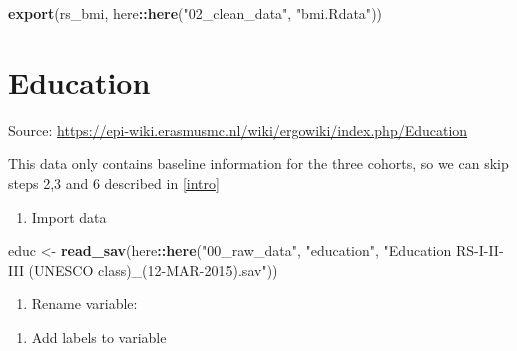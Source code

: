 \documentclass[]{book}
\newenvironment{Shaded}{\begin{snugshade}}{\end{snugshade}}
\newcommand{\DataTypeTok}[1]{\textcolor[rgb]{0.13,0.29,0.53}{#1}}
\newcommand{\KeywordTok}[1]{\textcolor[rgb]{0.13,0.29,0.53}{\textbf{#1}}}
\newcommand{\NormalTok}[1]{#1}
\newcommand{\OperatorTok}[1]{\textcolor[rgb]{0.81,0.36,0.00}{\textbf{#1}}}
\newcommand{\StringTok}[1]{\textcolor[rgb]{0.31,0.60,0.02}{#1}}
\providecommand{\tightlist}{%
  \setlength{\itemsep}{0pt}\setlength{\parskip}{0pt}}
\begin{document}
\begin{Shaded}
\begin{Highlighting}[]
\KeywordTok{export}\NormalTok{(rs_bmi, here}\OperatorTok{::}\KeywordTok{here}\NormalTok{(}\StringTok{"02_clean_data"}\NormalTok{, }\StringTok{"bmi.Rdata"}\NormalTok{))}
\end{Highlighting}
\end{Shaded}

\hypertarget{education}{%
\chapter{Education}\label{education}}

Source: \url{https://epi-wiki.erasmusmc.nl/wiki/ergowiki/index.php/Education}

This data only contains baseline information for the three cohorts, so we can skip steps 2,3 and 6 described in \ref{intro}

\begin{enumerate}
\def\labelenumi{\arabic{enumi}.}
\tightlist
\item
  Import data
\end{enumerate}

\begin{Shaded}
\begin{Highlighting}[]
\NormalTok{educ <-}\StringTok{ }\KeywordTok{read_sav}\NormalTok{(here}\OperatorTok{::}\KeywordTok{here}\NormalTok{(}\StringTok{"00_raw_data"}\NormalTok{, }\StringTok{"education"}\NormalTok{, }\StringTok{"Education RS-I-II-III (UNESCO class)_(12-MAR-2015).sav"}\NormalTok{))}
\end{Highlighting}
\end{Shaded}

\begin{enumerate}
\def\labelenumi{\arabic{enumi}.}
\setcounter{enumi}{1}
\tightlist
\item
  Rename variable:
\end{enumerate}

\begin{Shaded}
\end{Shaded}

\begin{enumerate}
\def\labelenumi{\arabic{enumi}.}
\setcounter{enumi}{2}
\tightlist
\item
  Add labels to variable
\end{enumerate}
\end{document}
